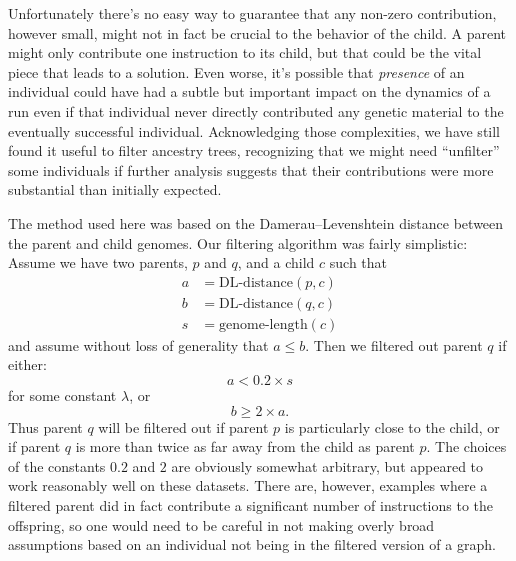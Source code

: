 \documentclass{sig-alternate}
\begin{document}
Unfortunately there's no easy way to guarantee that any non-zero contribution, 
however small, might not in fact be crucial to the behavior of the child. A 
parent might only contribute one instruction to its child, but that could be 
the vital piece that leads to a solution. Even worse, it's possible that
\emph{presence} of an individual could have had a subtle but important impact 
on the dynamics of a run even if that individual never directly contributed any 
genetic material to the eventually successful individual. Acknowledging those
complexities, we have still found it useful to filter ancestry trees, 
recognizing that we might need ``unfilter'' some individuals if further
analysis suggests that their contributions were more substantial than initially
expected.

The method used here was based on the Damerau--Levenshtein distance between the
parent and child genomes. Our filtering algorithm was fairly simplistic: Assume we have two parents, $p$ and $q$, and a child $c$ such that
\begin{align*}
	a & = \textrm{DL-distance}(p, c) \\
	b & = \textrm{DL-distance}(q, c) \\
	s & = \textrm{genome-length}(c)
\end{align*}
and assume without loss of generality that $a \leq b$.
Then we filtered out parent $q$ if either:
\[
	a < 0.2 \times s
\]
for some constant $\lambda$, or
\[
	b \geq 2 \times a.
\]
Thus parent $q$ will be filtered out if parent $p$ is particularly close to
the child, or if parent $q$ is more than twice as far away from the child as
parent $p$. The choices of the constants $0.2$ and $2$ are obviously somewhat
arbitrary, but appeared to work reasonably well on these datasets. There are,
however, examples where a filtered parent did in fact contribute a significant
number of instructions to the offspring, so one would need to be careful in not
making overly broad assumptions based on an individual not being in the filtered
version of a graph.

\end{document}
